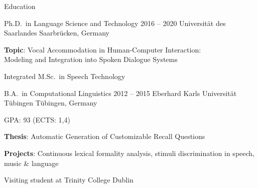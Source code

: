 \documentclass{resume} %
\begin{document}
\begin{rSection}{Education}

\begin{rSubsection}
	{Ph.D.\ in Language Science and Technology}
	{2016 -- 2020}
	{Universität des Saarlandes}
	{Saarbrücken, Germany} %
	
	\setlength{\itemindent}{.7cm}
		
	\item \textbf{Topic}: Vocal Accommodation in Human-Computer Interaction:\\\hspace*{2.05cm}Modeling and Integration into Spoken Dialogue Systems %
	\item Integrated M.Sc.\ in Speech Technology
\end{rSubsection}

%	
%	

\begin{rSubsection}
	{B.A.\ in Computational Linguistics}
	{2012 -- 2015}
	{Eberhard Karls Universität Tübingen}
	{Tübingen, Germany}
	
	\vspace*{-.2cm}
	\item[]{\footnotesize GPA: 93 (ECTS: 1,4)}
	\vspace*{.2cm}

	\setlength{\itemindent}{.7cm}
	
	\item \textbf{Thesis}: Automatic Generation of Customizable Recall Questions
	\item \textbf{Projects}: Continuous lexical formality analysis, stimuli discrimination in speech, music \& language
	\item Visiting student at Trinity College Dublin 
\end{rSubsection}

\end{rSection}
\end{document}
